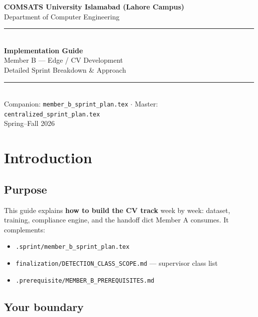 \documentclass[12pt,a4paper]{report}
\begin{document}
\begin{titlepage}
\centering
\vspace*{1cm}
{\Large\color{primary}\textbf{COMSATS University Islamabad (Lahore Campus)}}\\[0.3cm]
{\large Department of Computer Engineering}\\[1cm]
\rule{\textwidth}{2pt}\\[0.8cm]
{\Huge\bfseries\color{memberb} Implementation Guide}\\[0.4cm]
{\Large Member B --- Edge / CV Development}\\[0.2cm]
{\large Detailed Sprint Breakdown \& Approach}\\[0.3cm]
\rule{\textwidth}{2pt}\\[1cm]
{\small Companion: \texttt{member\_b\_sprint\_plan.tex} $\cdot$ Master: \texttt{centralized\_sprint\_plan.tex}}\\
\vfill
{\large Spring--Fall 2026}
\end{titlepage}

\tableofcontents
\newpage

\chapter{Introduction}

\section{Purpose}

This guide explains \textbf{how to build the CV track} week by week: dataset, training, compliance engine, and the handoff dict Member A consumes. It complements:

\begin{itemize}
    \item \texttt{.sprint/member\_b\_sprint\_plan.tex}
    \item \texttt{finalization/DETECTION\_CLASS\_SCOPE.md} --- supervisor class list
    \item \texttt{.prerequisite/MEMBER\_B\_PREREQUISITES.md}
\end{itemize}

\section{Your boundary}
\end{document}
